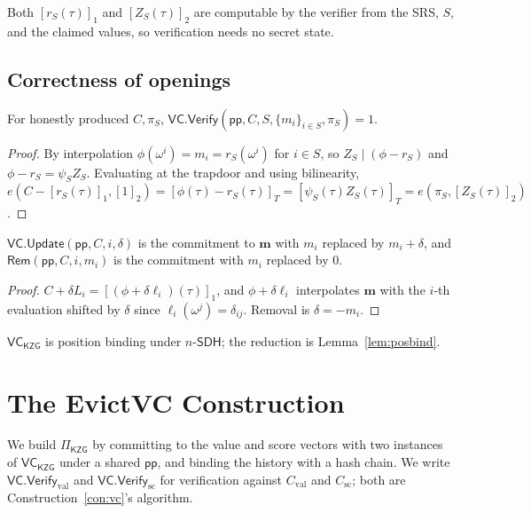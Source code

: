 \documentclass[version=submission]{iacrcc}
\theoremstyle{definition}
\newcommand{\Vfy}{\mathsf{Verify}}
\newcommand{\Update}{\mathsf{Update}}
\newcommand{\Rem}{\mathsf{Rem}}
\newcommand{\pp}{\mathsf{pp}}
\newcommand{\Val}{\mathrm{val}}
\newcommand{\Sc}{\mathrm{sc}}
\newcommand{\Cval}{C_{\Val}}
\newcommand{\Csc}{C_{\Sc}}
\newcommand{\VC}{\mathsf{VC}}
\newcommand{\gone}[1]{\left[#1\right]_{1}}
\newcommand{\gtwo}[1]{\left[#1\right]_{2}}
\newcommand{\gtt}[1]{\left[#1\right]_{T}}
\newcommand{\lag}{\ell}
\newcommand{\nsdh}{n\text{-}\mathsf{SDH}}
\newcommand{\Zpol}{Z}
\newcommand{\rpol}{r}
\begin{document}
Both $\gone{\rpol_S(\tau)}$ and $\gtwo{\Zpol_S(\tau)}$ are computable by the
verifier from the SRS, $S$, and the claimed values, so verification needs no
secret state.

\subsection{Correctness of openings}

\begin{lemma}\label{lem:open}
For honestly produced $C,\pi_S$, $\VC.\Vfy(\pp,C,S,\{m_i\}_{i\in S},\pi_S)=1$.
\end{lemma}
\begin{proof}
By interpolation $\phi(\omega^{i})=m_i=\rpol_S(\omega^{i})$ for $i\in S$, so
$\Zpol_S\mid(\phi-\rpol_S)$ and $\phi-\rpol_S=\psi_S\Zpol_S$. Evaluating at the
trapdoor and using bilinearity,
$e(C-\gone{\rpol_S(\tau)},\gtwo{1})=\gtt{\phi(\tau)-\rpol_S(\tau)}
 =\gtt{\psi_S(\tau)\Zpol_S(\tau)}=e(\pi_S,\gtwo{\Zpol_S(\tau)})$.
\end{proof}

\begin{lemma}\label{lem:update}
$\VC.\Update(\pp,C,i,\delta)$ is the commitment to $\mathbf{m}$ with $m_i$
replaced by $m_i+\delta$, and $\Rem(\pp,C,i,m_i)$ is the commitment with $m_i$
replaced by $0$.
\end{lemma}
\begin{proof}
$C+\delta L_i=\gone{(\phi+\delta\lag_i)(\tau)}$, and $\phi+\delta\lag_i$
interpolates $\mathbf{m}$ with the $i$-th evaluation shifted by $\delta$ since
$\lag_i(\omega^{j})=\delta_{ij}$. Removal is $\delta=-m_i$.
\end{proof}

\begin{remark}\label{rem:vcbind}
$\VC_{\mathsf{KZG}}$ is position binding under $\nsdh$; the reduction is
Lemma~\ref{lem:posbind}.
\end{remark}

\section{The EvictVC Construction}\label{sec:construction}

We build $\Pi_{\mathsf{KZG}}$ by committing to the value and score vectors with
two instances of $\VC_{\mathsf{KZG}}$ under a shared $\pp$, and binding the
history with a hash chain. We write $\VC.\Vfy_{\Val}$ and $\VC.\Vfy_{\Sc}$ for
verification against $\Cval$ and $\Csc$; both are
Construction~\ref{con:vc}'s algorithm.
\end{document}
